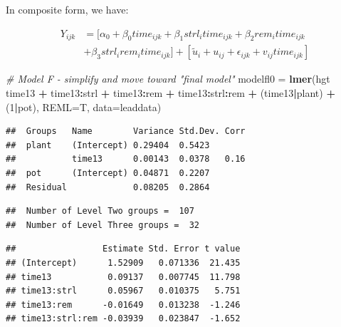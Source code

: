\documentclass[
]{krantz}
\newenvironment{Shaded}{\begin{snugshade}}{\end{snugshade}}
\newcommand{\CommentTok}[1]{\textcolor[rgb]{0.37,0.37,0.37}{\textit{#1}}}
\newcommand{\DataTypeTok}[1]{\textcolor[rgb]{0.27,0.27,0.27}{#1}}
\newcommand{\DecValTok}[1]{\textcolor[rgb]{0.06,0.06,0.06}{#1}}
\newcommand{\KeywordTok}[1]{\textcolor[rgb]{0.27,0.27,0.27}{\textbf{#1}}}
\newcommand{\NormalTok}[1]{#1}
\newcommand{\OperatorTok}[1]{\textcolor[rgb]{0.43,0.43,0.43}{\textbf{#1}}}
\newcommand{\StringTok}[1]{\textcolor[rgb]{0.5,0.5,0.5}{#1}}
\begin{document}
In composite form, we have:

\begin{align*}
Y_{ijk} & = [\alpha_{0}+ \beta_{0}\textstyle{time}_{ijk} + \beta_{1}\textstyle{strl}_{i}\textstyle{time}_{ijk} + \beta_{2}\textstyle{rem}_{i}\textstyle{time}_{ijk}  \\
 & + \beta_{3}\textstyle{strl}_{i}\textstyle{rem}_{i}\textstyle{time}_{ijk}] + [\tilde{u}_{i}+u_{ij}+ \epsilon_{ijk}+ v_{ij}\textstyle{time}_{ijk}]
\end{align*}

\begin{Shaded}
\begin{Highlighting}[]
\CommentTok{# Model F - simplify and move toward "final model"}
\NormalTok{modelfl0 =}\StringTok{ }\KeywordTok{lmer}\NormalTok{(hgt }\OperatorTok{~}\StringTok{ }\NormalTok{time13 }\OperatorTok{+}\StringTok{ }\NormalTok{time13}\OperatorTok{:}\NormalTok{strl }\OperatorTok{+}\StringTok{ }
\StringTok{  }\NormalTok{time13}\OperatorTok{:}\NormalTok{rem }\OperatorTok{+}\StringTok{ }\NormalTok{time13}\OperatorTok{:}\NormalTok{strl}\OperatorTok{:}\NormalTok{rem }\OperatorTok{+}
\StringTok{  }\NormalTok{(time13}\OperatorTok{|}\NormalTok{plant) }\OperatorTok{+}\StringTok{ }\NormalTok{(}\DecValTok{1}\OperatorTok{|}\NormalTok{pot), }\DataTypeTok{REML=}\NormalTok{T, }\DataTypeTok{data=}\NormalTok{leaddata)}
\end{Highlighting}
\end{Shaded}

\begin{verbatim}
##  Groups   Name        Variance Std.Dev. Corr
##  plant    (Intercept) 0.29404  0.5423       
##           time13      0.00143  0.0378   0.16
##  pot      (Intercept) 0.04871  0.2207       
##  Residual             0.08205  0.2864
\end{verbatim}

\begin{verbatim}
##  Number of Level Two groups =  107 
##  Number of Level Three groups =  32
\end{verbatim}

\begin{verbatim}
##                 Estimate Std. Error t value
## (Intercept)      1.52909   0.071336  21.435
## time13           0.09137   0.007745  11.798
## time13:strl      0.05967   0.010375   5.751
## time13:rem      -0.01649   0.013238  -1.246
## time13:strl:rem -0.03939   0.023847  -1.652
\end{verbatim}
\end{document}
